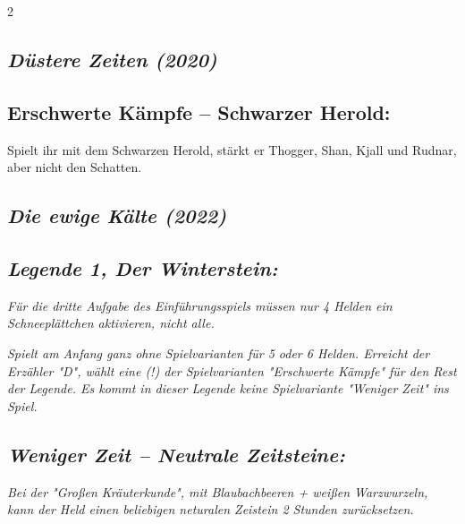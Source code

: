 \documentclass[10pt, a4paper, oneside]{book}
\newcommand{\fan}[1]{\textit{#1}}
\begin{document}
\begin{multicols*}{2}
\begin{bgcolor}[color-ag]
\end{bgcolor}



\begin{bgcolor}[color-dz]
\section{\fan{Düstere Zeiten (2020)}}

\subsection{Erschwerte Kämpfe – Schwarzer Herold:}

Spielt ihr mit dem Schwarzen Herold, stärkt er Thogger, Shan, Kjall und Rudnar, aber nicht den Schatten.
\supercite{dz-begleitheft}


\end{bgcolor}


\begin{bgcolor}
\section{\fan{Die ewige Kälte (2022)}}


\subsection{\fan{Legende 1, Der Winterstein:}}


\fan{Für die dritte Aufgabe des Einführungsspiels müssen nur 4 Helden ein Schneeplättchen aktivieren, nicht alle.}

\fan{Spielt am Anfang ganz ohne Spielvarianten für 5 oder 6 Helden. Erreicht der Erzähler "D", wählt eine (!) der Spielvarianten "Erschwerte Kämpfe" für den Rest der Legende. Es kommt in dieser Legende keine Spielvariante "Weniger Zeit" ins Spiel.}


\subsection{\fan{Weniger Zeit – Neutrale Zeitsteine:}}

\fan{Bei der "Großen Kräuterkunde", mit Blaubachbeeren + weißen Warzwurzeln, kann der Held einen beliebigen neturalen Zeistein 2 Stunden zurücksetzen.}

\end{bgcolor}




\columnbreak




\end{multicols*}
\end{document}
